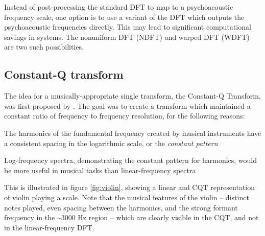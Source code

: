 \documentclass[letter,12pt,notitlepage]{article}
\newenvironment{tight_itemize}{
\begin{itemize}
  \setlength{\itemsep}{0pt}
  \setlength{\parskip}{0pt}
}{\end{itemize}}
\begin{document}
Instead of post-processing the standard DFT to map to a psychoacoustic frequency scale, one option is to use a variant of the DFT which outputs the psychoacoustic frequencies directly. This may lead to significant computational savings in systems. The nonuniform DFT (NDFT) and warped DFT (WDFT) are two such possibilities.

\subsection{Constant-Q transform}

The idea for a musically-appropriate single transform, the Constant-Q Transform, was first proposed by \citet{jbrown}. The goal was to create a transform which maintained a constant ratio of frequency to frequency resolution, for the following reasons:

\begin{tight_itemize}
	\item
		The harmonics of the fundamental frequency created by musical instruments have a consistent spacing in the logarithmic scale, or the \textit{constant pattern}
	\item
		Log-frequency spectra, demonstrating the constant pattern for harmonics, would be more useful in musical tasks than linear-frequency spectra
\end{tight_itemize}

This is illustrated in figure \ref{fig:violin}, showing a linear and CQT representation of violin playing a scale. Note that the musical features of the violin -- distinct notes played, even spacing between the harmonics, and the strong formant frequency in the \textasciitilde3000 Hz region -- which are clearly visible in the CQT, and not in the linear-frequency DFT.
\end{document}
